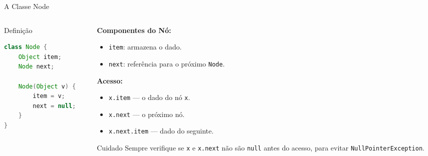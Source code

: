 \documentclass[aspectratio=169]{beamer}
\begin{document}
\begin{frame}[fragile]{A Classe Node}
    \begin{columns}[T]
        \begin{column}{0.45\textwidth}
            \begin{block}{Definição}
                \begin{lstlisting}[language=Java, basicstyle=\ttfamily\small, keywordstyle=\color{blue}]
class Node {
    Object item;
    Node next;

    Node(Object v) {
        item = v;
        next = null;
    }
}
                \end{lstlisting}
            \end{block}
        \end{column}
        \begin{column}{0.53\textwidth}
            \textbf{Componentes do Nó:}
            \begin{itemize}
                \item \texttt{item}: armazena o dado.
                \item \texttt{next}: referência para o próximo \texttt{Node}.
            \end{itemize}
            \vspace{0.2cm}
            \textbf{Acesso:}
            \begin{itemize}
                \item \texttt{x.item} --- o dado do nó \texttt{x}.
                \item \texttt{x.next} --- o próximo nó.
                \item \texttt{x.next.item} --- dado do seguinte.
            \end{itemize}
            \vspace{0.1cm}
            \begin{alertblock}{\small Cuidado}
                \scriptsize Sempre verifique se \texttt{x} e \texttt{x.next} não são \texttt{null} antes do acesso, para evitar \texttt{NullPointerException}.
            \end{alertblock}
        \end{column}
    \end{columns}
\end{frame}
\end{document}
